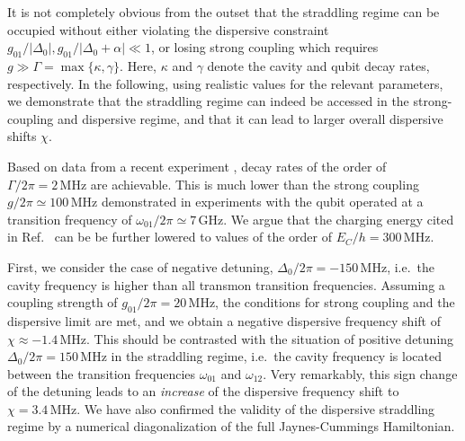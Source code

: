 \documentclass[twocolumn,amsmath,amssymb,floatfix,pra,showpacs,eqsecnum,footinbib,superscriptaddress]{revtex4}
\newcommand{\abs}[1]{\left|#1\right|}
\begin{document}
It is not completely obvious from the outset that the straddling regime can be occupied without either violating the dispersive constraint $g_{01}/\abs{\Delta_0},g_{01}/\abs{\Delta_0 +\alpha} \ll1$, or losing strong coupling which requires $g\gg \Gamma=\max\{\kappa,\gamma\}$. Here, $\kappa$ and $\gamma$ denote the cavity and qubit decay rates, respectively.  In the following, using realistic values for the relevant parameters, we demonstrate that the straddling regime can indeed be accessed in the strong-coupling and dispersive regime, and that it can lead to larger overall dispersive shifts $\chi$.

Based on data from a recent experiment \cite{schuster},  decay rates of the order of $\Gamma/2\pi=2\,\text{MHz}$ are achievable. This is much lower than the strong coupling $g/2\pi\simeq 100\,\text{MHz}$ demonstrated in experiments with the qubit operated at a transition frequency of $\omega_{01}/2\pi\simeq7\,\text{GHz}$. We argue that the charging energy cited in Ref.~\cite{schuster} can be be further lowered to values of the order of $E_C/h=300\,\text{MHz}$. 

First, we consider the case of negative detuning, $\Delta_0/2\pi=-150\,\text{MHz}$, i.e.\ the cavity frequency is higher than all transmon transition frequencies. Assuming a coupling strength of $g_{01}/2\pi=20\,\text{MHz}$, the conditions for strong coupling and the dispersive limit are met, and we obtain a negative dispersive frequency shift of $\chi\approx-1.4\,\text{MHz}$. This should be contrasted with the situation of positive detuning $\Delta_0/2\pi=150\,\text{MHz}$ in the straddling regime, i.e.\ the cavity frequency is located between the transition frequencies $\omega_{01}$ and $\omega_{12}$. Very remarkably, this sign change of the detuning leads to an \emph{increase} of the dispersive frequency shift to $\chi=3.4\,\text{MHz}$. We have also confirmed the validity of the dispersive straddling regime by a numerical diagonalization of the full Jaynes-Cummings Hamiltonian.

\end{document}
